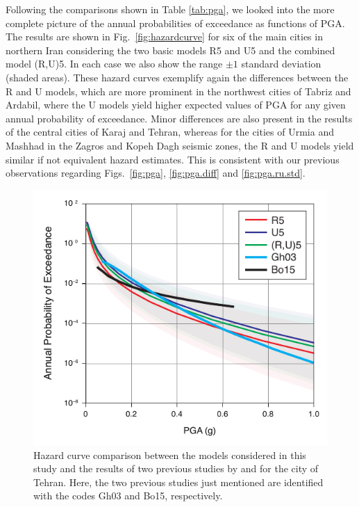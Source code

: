 Following the comparisons shown in Table \ref{tab:pga}, we looked into the more complete picture of the annual probabilities of exceedance as functions of PGA. The results are shown in Fig.~\ref{fig:hazardcurve} for six of the main cities in northern Iran considering the two basic models R5 and U5 and the combined model (R,U)5. In each case we also show the range $\pm 1$ standard deviation (shaded areas). These hazard curves exemplify again the differences between the R and U models, which are more prominent in the northwest cities of Tabriz and Ardabil, where the U models yield higher expected values of PGA for any given annual probability of exceedance. Minor differences are also present in the results of the central cities of Karaj and Tehran, whereas for the cities of Urmia and Mashhad in the Zagros and Kopeh Dagh seismic zones, the R and U models yield similar if not equivalent hazard estimates. This is consistent with our previous observations regarding Figs.~\ref{fig:pga}, \ref{fig:pga.diff} and \ref{fig:pga.ru.std}.

\begin{figure}[t]
    \centering
    \includegraphics[width=\columnwidth]{figures/pdf/figure-12} 
    \caption{Hazard curve comparison between the models considered in this study and the results of two previous studies by \citet{Ghodrati2003} and \citet{Boostan2015} for the city of Tehran. Here, the two previous studies just mentioned are identified with the codes Gh03 and Bo15, respectively.}
    \label{fig:tehran}
\end{figure}

